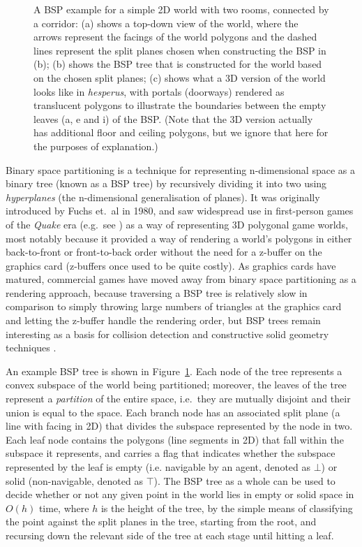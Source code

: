 \documentclass[10pt,twocolumn]{article}
\newenvironment{stusubfig}[1]
{
	\begin{figure}[#1]
	\begin{center}
}
{
	\end{center}
	\end{figure}
}
\begin{document}
\begin{stusubfig}{p}
\caption{A BSP example for a simple 2D world with two rooms, connected by a corridor: (a) shows a top-down view of the world, where the arrows represent the facings of the world polygons and the dashed lines represent the split planes chosen when constructing the BSP in (b); (b) shows the BSP tree that is constructed for the world based on the chosen split planes; (c) shows what a 3D version of the world looks like in \emph{hesperus}, with portals (doorways) rendered as translucent polygons to illustrate the boundaries between the empty leaves (a, e and i) of the BSP. (Note that the 3D version actually has additional floor and ceiling polygons, but we ignore that here for the purposes of explanation.)}
\label{fig:bsp-example}
\end{stusubfig}

Binary space partitioning is a technique for representing n-dimensional space as a binary tree (known as a BSP tree) by recursively dividing it into two using \emph{hyperplanes} (the n-dimensional generalisation of planes). It was originally introduced by Fuchs et.\ al \cite{fuchs80} in 1980, and saw widespread use in first-person games of the \emph{Quake} era (e.g.~see \cite{abrash97}) as a way of representing 3D polygonal game worlds, most notably because it provided a way of rendering a world's polygons in either back-to-front or front-to-back order \cite{fuchs80,gordon91} without the need for a z-buffer on the graphics card (z-buffers once used to be quite costly). As graphics cards have matured, commercial games have moved away from binary space partitioning as a rendering approach, because traversing a BSP tree is relatively slow in comparison to simply throwing large numbers of triangles at the graphics card and letting the z-buffer handle the rendering order, but BSP trees remain interesting as a basis for collision detection and constructive solid geometry techniques \cite{ericson05,lysenko08}.

An example BSP tree is shown in Figure~\ref{fig:bsp-example}. Each node of the tree represents a convex subspace of the world being partitioned; moreover, the leaves of the tree represent a \emph{partition} of the entire space, i.e.~they are mutually disjoint and their union is equal to the space. Each branch node has an associated split plane (a line with facing in 2D) that divides the subspace represented by the node in two. Each leaf node contains the polygons (line segments in 2D) that fall within the subspace it represents, and carries a flag that indicates whether the subspace represented by the leaf is empty (i.e. navigable by an agent, denoted as $\bot$) or solid (non-navigable, denoted as $\top$). The BSP tree as a whole can be used to decide whether or not any given point in the world lies in empty or solid space in $O(h)$ time, where $h$ is the height of the tree, by the simple means of classifying the point against the split planes in the tree, starting from the root, and recursing down the relevant side of the tree at each stage until hitting a leaf.
\end{document}
